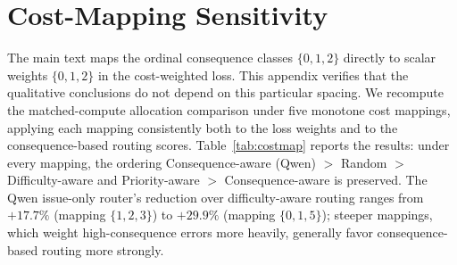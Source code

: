 \documentclass{article}
\begin{document}
\section{Cost-Mapping Sensitivity}
\label{app:costmap}

The main text maps the ordinal consequence classes $\{0,1,2\}$
directly to scalar weights $\{0,1,2\}$ in the cost-weighted loss. This
appendix verifies that the qualitative conclusions do not depend on
this particular spacing. We recompute the matched-compute allocation
comparison under five monotone cost mappings, applying each mapping
consistently both to the loss weights and to the consequence-based
routing scores. Table~\ref{tab:costmap} reports the results: under
every mapping, the ordering Consequence-aware (Qwen) $>$ Random $>$
Difficulty-aware and Priority-aware $>$ Consequence-aware is
preserved. The Qwen issue-only router's reduction over
difficulty-aware routing ranges from $+17.7\%$ (mapping $\{1,2,3\}$)
to $+29.9\%$ (mapping $\{0,1,5\}$); steeper mappings, which weight
high-consequence errors more heavily, generally favor
consequence-based routing more strongly.

\begin{table}[h]
\centering
\caption{\textbf{Cost-mapping sensitivity.} Cost-weighted loss (and
reduction vs.\ difficulty-aware) at the top-$25\%$ matched-compute
operating point under five monotone mappings of the consequence
classes $\{0,1,2\}$ to scalar weights. The Random column uses one
representative fixed draw for comparability across mappings. The
strategy ordering is preserved under every mapping.}
\label{tab:costmap}
\small
{}
\end{table}
\end{document}
